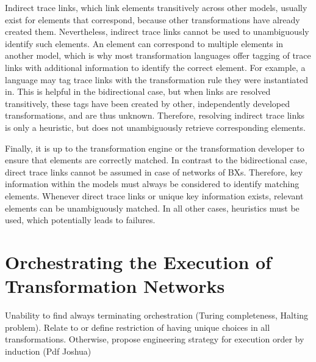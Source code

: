 Indirect trace links, which link elements transitively across other models, usually exist for elements that correspond, because other transformations have already created them.
Nevertheless, indirect trace links cannot be used to unambiguously identify such elements.
An element can correspond to multiple elements in another model, which is why most transformation languages offer tagging of trace links with additional information to identify the correct element.
For example, a language may tag trace links with the transformation rule they were instantiated in.
This is helpful in the bidirectional case, but when links are resolved transitively, these tags have been created by other, independently developed transformations, and are thus unknown.
Therefore, resolving indirect trace links is only a heuristic, but does not unambiguously retrieve corresponding elements.



Finally, it is up to the transformation engine or the transformation developer %
to ensure that elements are correctly matched.
In contrast to the bidirectional case, direct trace links cannot be assumed in case of networks of \acp{BX}.
Therefore, key information within the models must always be considered to identify matching elements.
Whenever direct trace links or unique key information exists, relevant elements can be unambiguously matched.
In all other cases, heuristics must be used, which potentially leads to failures.



\section{Orchestrating the Execution of Transformation Networks }
Unability to find always terminating orchestration (Turing completeness, Halting problem). Relate to or define restriction of having unique choices in all transformations. Otherwise, propose engineering strategy for execution order by induction (Pdf Joshua)



